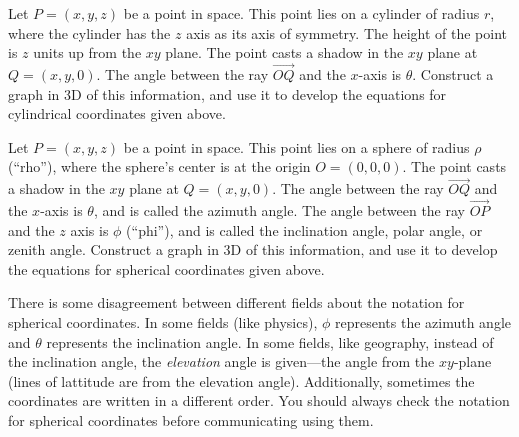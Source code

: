 \begin{problem} 
Let $P=(x,y,z)$ be a point in space. This point lies on a cylinder of radius $r$, where the cylinder has the $z$ axis as its axis of symmetry.  The height of the point is $z$ units up from the $xy$ plane. The point casts a shadow in the $xy$ plane at $Q=(x,y,0)$.  The angle between the ray $\vec{OQ}$ and the $x$-axis is $\theta$. Construct a graph in 3D of this information, and use it to develop the equations for cylindrical coordinates given above.
\end{problem}

\begin{problem}  \label{derive spherical coordinates} Let
  $P=(x,y,z)$ be a point in space. This point lies on a sphere of
  radius $\rho$ (``rho''), where the sphere's center is at the origin
  $O=(0,0,0)$. The point casts a shadow in the $xy$ plane at
  $Q=(x,y,0)$.  The angle between the ray $\vec{OQ}$ and the $x$-axis
  is $\theta$, and is called the azimuth angle. The angle between
  the ray $\vec{OP}$ and the $z$ axis is $\phi$ (``phi''), and is
  called the inclination angle, polar angle, or zenith angle.  Construct
  a graph in 3D of this information, and use it to develop the
  equations for spherical coordinates given above.
\end{problem}

%
There is some disagreement between different fields about the notation
for spherical coordinates.  In some fields (like physics), $\phi$
represents the azimuth angle and $\theta$ represents the inclination
angle.  In some fields, like geography, instead of the inclination angle, the
\emph{elevation} angle is given---the angle from the $xy$-plane (lines
of lattitude are from the elevation angle).
Additionally, sometimes the coordinates are written in a different
order.  You should always check the notation for spherical coordinates
before communicating using them.


